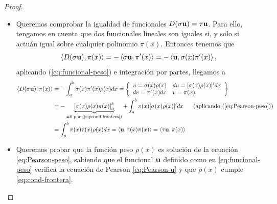 \begin{proof}
    \begin{itemize}
        \item[\fbox{$\Rightarrow$}] Queremos comprobar la igualdad de funcionales $D(\sigma \mathbf{u})=\tau\mathbf{u}$. Para ello, tengamos en cuenta que dos funcionales lineales son iguales si, y solo si actuán igual sobre cualquier polinomio $\pi(x)$. Entonces tenemos que
        $$
        \left\langle D(\sigma \mathbf{u}) , \pi(x) \right\rangle = -\left\langle \sigma \mathbf{u} , \pi'(x) \right\rangle= -\left\langle \mathbf{u} , \sigma(x)\pi'(x) \right\rangle,
        $$
        aplicando (\ref{eq:funcional-peso}) e integración por partes, llegamos a
        \begin{equation*}
            \begin{split}
                \prodesc{D(\sigma \uu)}{\pi(x)} &= -\int_a^b \sigma(x)\pi'(x)\rho(x)dx = \left\{\begin{array}{ll}
                    u = \sigma(x)\rho(x) & du=[\sigma(x)\rho(x)]'dx \\
                    dv = \pi'(x)dx & v = \pi(x)
                \end{array}\right\} \\
                &= -\underbrace{\left[\sigma(x)\rho(x)\pi(x)\right]_a^b}_{=0\text{ por (\ref{eq:cond-frontera})}}+ \int_a^b \pi(x) [\sigma(x)\rho(x)]'dx\ \ \ \ \  \text{(aplicando (\ref{eq:Pearson-peso}))} \\
                &= \int_a^b \pi(x) \tau(x)\rho(x)dx = \prodesc{\uu}{\tau(x)\pi(x)} = \prodesc{\tau \uu}{\pi(x)}
            \end{split}
        \end{equation*}
        \item[\fbox{$\Leftarrow$}] Queremos probar que la función peso $\rho(x)$ es solución de la ecuación \eqref{eq:Pearson-peso}, sabiendo que el funcional $\mathbf{u}$ definido como en \eqref{eq:funcional-peso} verifica la ecuación de Pearson \eqref{eq:Pearson-u} y que $\rho(x)$ cumple \eqref{eq:cond-frontera}.


\end{itemize}
\end{proof}
